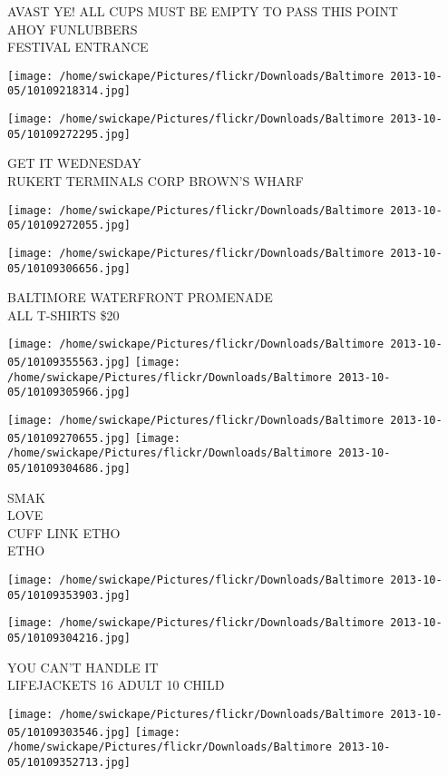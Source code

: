 \documentclass[10pt,letterpaper]{article}
\begin{document}
AVAST YE! ALL CUPS MUST BE EMPTY TO PASS THIS POINT\\
AHOY FUNLUBBERS\\
FESTIVAL ENTRANCE
\pagebreak

\texttt{[image: /home/swickape/Pictures/flickr/Downloads/Baltimore 2013-10-05/10109218314.jpg]}

\vspace{0.25in}
\texttt{[image: /home/swickape/Pictures/flickr/Downloads/Baltimore 2013-10-05/10109272295.jpg]}

GET IT WEDNESDAY\\
RUKERT TERMINALS CORP BROWN'S WHARF
\pagebreak

\texttt{[image: /home/swickape/Pictures/flickr/Downloads/Baltimore 2013-10-05/10109272055.jpg]}

\vspace{0.25in}
\texttt{[image: /home/swickape/Pictures/flickr/Downloads/Baltimore 2013-10-05/10109306656.jpg]}

BALTIMORE WATERFRONT PROMENADE\\
ALL T{-}SHIRTS \$20
\pagebreak

\texttt{[image: /home/swickape/Pictures/flickr/Downloads/Baltimore 2013-10-05/10109355563.jpg]}
\texttt{[image: /home/swickape/Pictures/flickr/Downloads/Baltimore 2013-10-05/10109305966.jpg]}

\texttt{[image: /home/swickape/Pictures/flickr/Downloads/Baltimore 2013-10-05/10109270655.jpg]}
\texttt{[image: /home/swickape/Pictures/flickr/Downloads/Baltimore 2013-10-05/10109304686.jpg]}

SMAK\\
LOVE\\
CUFF LINK ETHO\\
ETHO
\pagebreak

\texttt{[image: /home/swickape/Pictures/flickr/Downloads/Baltimore 2013-10-05/10109353903.jpg]}

\vspace{0.25in}
\texttt{[image: /home/swickape/Pictures/flickr/Downloads/Baltimore 2013-10-05/10109304216.jpg]}

YOU CAN'T HANDLE IT\\
LIFEJACKETS 16 ADULT 10 CHILD
\pagebreak

\texttt{[image: /home/swickape/Pictures/flickr/Downloads/Baltimore 2013-10-05/10109303546.jpg]}
\texttt{[image: /home/swickape/Pictures/flickr/Downloads/Baltimore 2013-10-05/10109352713.jpg]}
\end{document}
